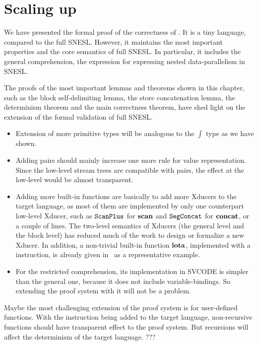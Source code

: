 \section{Scaling up}

We have presented the formal proof of the correctness of \fmsnesl. 
It is a tiny language, compared to the full SNESL. 
However, it maintains the most important properties and the core semantics of full SNESL.
In particular, it includes the general comprehension, the expression for expressing nested data-parallelism in SNESL. 
 
The proofs of the most important lemmas and theorems shown in this chapter, such as the block self-delimiting lemma, the store concatenation lemma, the determinism theorem and the main correctness theorem, have shed light on the extension of  the formal validation of full SNESL. 


\begin{itemize}
	\item Extension of more primitive types will be analogous to the $\int$ type as we have shown.
	
	\item Adding pairs should mainly increase one more rule for value representation. Since the low-level stream trees are compatible with pairs, the effect at the low-level would be almost transparent. 
	
	\item Adding more built-in functions are basically to add more Xducers to the target language, as most of them are implemented by only one counterpart low-level Xducer, such as $\mathtt{ScanPlus}_{}$ for $\mathbf{scan}$ and $\mathtt{SegConcat}$ for $\mathbf{concat}$, or a couple of lines.
	The two-level semantics of Xducers (the general level and the block level) has reduced much of the work to design or formalize a new Xducer.
	In addition, a non-trivial built-in function $\mathbf{iota}$, implemented with a \wc instruction, is already given in \fmsnesl \  as a representative example.
 
	
	\item For the restricted comprehension, its implementation in SVCODE is simpler than the general one, because it does not include variable-bindings. So extending the proof system with it will not be a problem. 
	
\end{itemize}

Maybe the most challenging extension of the proof system is for user-defined functions. 
With the \sc instruction being added to the target language, non-recursive functions should have transparent effect to the proof system. 
But recursions will affect the determinism of the target language.  ???



